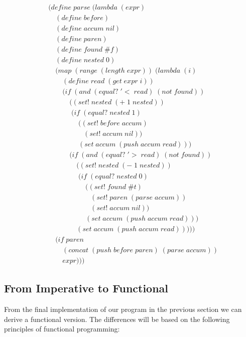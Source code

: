 \begin{figure}[htp]
\caption{}\label{fig:fullImperParser}
\begin{align*}
& (define \; parse \; (lambda \; (expr) \; 
\\& \quad (define \; before)
\\& \quad (define \; accum \; nil)
\\& \quad (define \; paren)
\\& \quad (define \; found \; \#f)
\\& \quad (define \; nested \; 0)
\\& \quad (map \; (range \; (length \; expr)) \; (lambda \; (i)
\\& \qquad (define \; read \; (get \; expr \; i))
\\& \qquad (if \; (and \; (equal? \; '< \; read) \; (not \; found))
\\& \qquad \quad ((set! \; nested \; (+ \; 1 \; nested))
\\& \qquad \quad \; (if \; (equal? \; nested \; 1)
\\& \qquad \qquad \; ((set! \; before \; accum)
\\& \qquad \qquad \quad (set! \; accum \; nil))
\\& \qquad \qquad \; (set \; accum \; (push \; accum \; read)))
\\& \qquad \quad (if \; (and \; (equal? \; '> \; read) \; (not \; found))
\\& \qquad \qquad ((set! \; nested \; (- \; 1 \; nested))
\\& \qquad \qquad \; (if \; (equal? \; nested \; 0)
\\& \qquad \qquad \quad \; ((set! \; found \; \#t)
\\& \qquad \qquad \qquad (set! \; paren \; (parse \; accum))
\\& \qquad \qquad \qquad (set! \; accum \; nil))
\\& \qquad \qquad \quad \; (set \; accum \; (push \; accum \; read)))
\\& \qquad \qquad (set \; accum \; (push \; accum \; read)))))
\\& \quad (if \; paren
\\& \qquad (concat \; (push \; before \; paren) \; (parse \; accum))
\\& \qquad expr)))
\end{align*}
\end{figure}

\subsection{From Imperative to Functional}
From the final implementation of our program in the previous section we can
derive a functional version. The differences will be based on the following
principles of functional programming:

